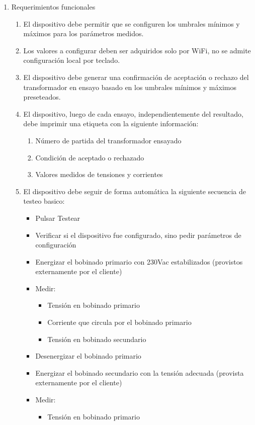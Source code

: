 \documentclass[11pt]{charter}
\begin{document}
\begin{enumerate}
\begin{enumerate}
	\end{enumerate}
\item Requerimientos funcionales
	\begin{enumerate}
	\item El dispositivo debe permitir que se configuren los umbrales mínimos y máximos para los parámetros medidos. 
	\item Los valores a configurar deben ser adquiridos solo por WiFi, no se admite configuración local por teclado.
	\item El dispositivo debe generar una confirmación de aceptación o rechazo del transformador en ensayo basado en los umbrales mínimos y máximos preseteados.
	\item El dispositivo, luego de cada ensayo, independientemente del resultado, debe imprimir una etiqueta con la siguiente información:
		\begin{enumerate}
		\item Número de partida del transformador ensayado
		\item Condición de aceptado o rechazado
		\item Valores medidos de tensiones y corrientes
		\end{enumerate}
	\item El dispositivo debe seguir de forma automática la siguiente secuencia de testeo basico:
		\begin{itemize}
		\item Pulsar Testear
		\item Verificar si el dispositivo fue configurado, sino pedir parámetros de configuración
		\item Energizar el bobinado primario con 230Vac estabilizados  (provistos externamente por el cliente)
		\item Medir:
			\begin{itemize}
			\item Tensión en bobinado primario
			\item Corriente que circula por el bobinado primario
			\item Tensión en bobinado secundario
			\end{itemize}
		\item Desenergizar el bobinado primario
		\item Energizar el bobinado secundario con la tensión adecuada (provista externamente por el cliente)
		\item Medir:
			\begin{itemize}
			\item Tensión en bobinado primario

\end{itemize}
\end{itemize}
\end{enumerate}
\end{enumerate}
\end{document}
